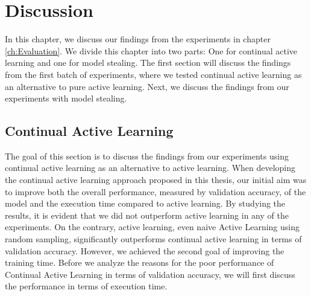 
\chapter{Discussion}
\label{ch:Discussion}
In this chapter, we discuss our findings from the experiments in chapter \ref{ch:Evaluation}. We divide this chapter into two parts: 
One for continual active learning and one for model stealing. The first section will discuss the findings from the first
batch of experiments, where we tested continual active learning as an alternative to pure active learning. Next, we discuss the findings
from our experiments with model stealing.

\section{Continual Active Learning}
\label{sec:Discussion:ContinualActiveLearning}
The goal of this section is to discuss the findings from our experiments using continual active learning as an alternative to active learning.
When developing the continual active learning approach proposed in this thesis, our initial aim was to improve both the overall performance,
measured by validation accuracy, of the model and the execution time compared to active learning. By studying the results, it is evident that
we did not outperform active learning in any of the experiments. On the contrary, active learning, even naive Active Learning using random sampling,
significantly outperforms continual active learning in terms of validation accuracy. However, we achieved the second goal of improving the training
time. Before we analyze the reasons for the poor performance of Continual Active Learning in terms of validation accuracy, we will first discuss
the performance in terms of execution time.

